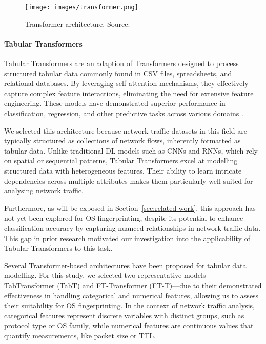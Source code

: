\begin{figure}[t!]
    \centering
    \texttt{[image: images/transformer.png]}    
    \caption{Transformer architecture. Source: \cite{vaswani_attention_2023}}
    \label{fig:transformer}
\end{figure}

\paragraph{Tabular Transformers}
\label{subsubsubsec:tabular-transformers}

Tabular Transformers are an adaption of Transformers designed to process structured tabular data commonly found in CSV files, spreadsheets, and relational databases. By leveraging self-attention mechanisms, they effectively capture complex feature interactions, eliminating the need for extensive feature engineering. These models have demonstrated superior performance in classification, regression, and other predictive tasks across various domains \cite{gorishniy_revisiting_2023}.  

We selected this architecture because network traffic datasets in this field are typically structured as collections of network flows, inherently formatted as tabular data. Unlike traditional DL models such as CNNs and RNNs, which rely on spatial or sequential patterns, Tabular Transformers excel at modelling structured data with heterogeneous features. Their ability to learn intricate dependencies across multiple attributes makes them particularly well-suited for analysing network traffic.  

Furthermore, as will be exposed in Section~\ref{sec:related-work}, this approach has not yet been explored for OS fingerprinting, despite its potential to enhance classification accuracy by capturing nuanced relationships in network traffic data. This gap in prior research motivated our investigation into the applicability of Tabular Transformers to this task.

Several Transformer-based architectures have been proposed for tabular data modelling. For this study, we selected two representative models—TabTransformer (TabT) and FT-Transformer (FT-T)—due to their demonstrated effectiveness in handling categorical and numerical features, allowing us to assess their suitability for OS fingerprinting. In the context of network traffic analysis, categorical features represent discrete variables with distinct groups, such as protocol type or OS family, while numerical features are continuous values that quantify measurements, like packet size or TTL.

